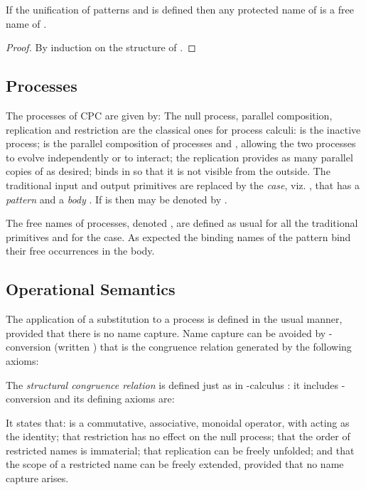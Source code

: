 \documentclass{LMCS}
\begin{document}
\begin{prop}
\label{prop:free_n_match}
If the unification of patterns  and  is defined then any protected
name of  is a free name of .
\end{prop}
\begin{proof}
By induction on the structure of . 
\end{proof}



\subsection{Processes}
\label{subsec:processes}

The processes of CPC are given by:
The null process, parallel composition, replication and restriction
are the classical ones for process calculi:  is the inactive
process;  is the parallel composition of processes  and
, allowing the two processes to evolve independently or to
interact; the replication  provides as many parallel copies of 
as desired;  binds  in  so that it is not visible from
the outside.  The
traditional input and output primitives are replaced by the {\em
  case}, viz.  , that has a {\em  pattern}  and a {\em body} .  If
 is  then  may be denoted by .


The free names of processes, denoted , are defined as
usual for all the traditional primitives and
for the case. As expected the binding names of the pattern bind their free occurrences in the body.


\subsection{Operational Semantics}
\label{s:reduction-new}

The application  of a substitution  to a process 
is defined in the usual manner, provided that there is no name
capture.
Name capture can be avoided by -conversion (written ) that
is the congruence relation generated by the following axioms:


The {\em structural congruence relation}  is defined
just as in -calculus \cite{milner:polyadic-tutorial}: it includes
-conversion and its defining axioms are:

It states that:  is a commutative, associative, monoidal operator,
with  acting as the identity; that restriction has no effect
on the null process; that the order of restricted names is
immaterial; that replication can be freely unfolded; and that the
scope of a restricted name can be freely extended, provided that no
name capture arises.
\end{document}
